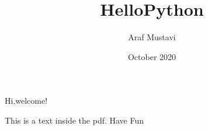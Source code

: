 \documentclass{article}
\title{HelloPython}
\author{Araf Mustavi}
\date{October 2020}
\begin{document}
\maketitle

Hi,welcome!


This is a text inside the pdf. Have Fun
\end{document}
